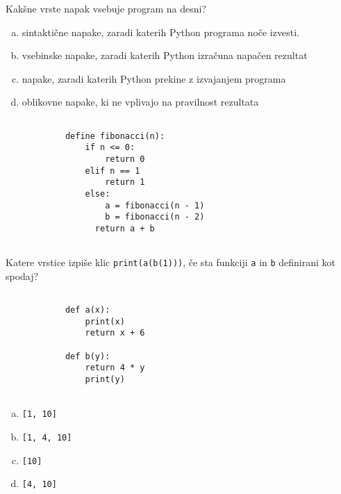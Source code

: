 \documentclass[arhiv, 10pt]{../izpit}
\newcommand{\inlinepy}[1]{\texttt{#1}}
\begin{document}
        \naloga*
        \begin{multicols}{2}
        \noindent
        Kakšne vrste napak vsebuje program na desni?

        \begin{enumerate}[(a)]
\item sintaktične napake, zaradi katerih Python programa noče izvesti.
\item vsebinske napake, zaradi katerih Python izračuna napačen rezultat
\item napake, zaradi katerih Python prekine z izvajanjem programa
\item oblikovne napake, ki ne vplivajo na pravilnost rezultata
\end{enumerate}

        \columnbreak

        \begin{verbatim}
        
            define fibonacci(n):
                if n <= 0:
                    return 0
                elif n == 1
                    return 1
                else:
                    a = fibonacci(n - 1)
                    b = fibonacci(n - 2)
                  return a + b
            
        \end{verbatim}

        \end{multicols}

    
        \naloga*
        Katere vrstice izpiše klic \inlinepy{print(a(b(1)))}, če sta funkciji \inlinepy{a} in \inlinepy{b} definirani kot spodaj?

        \begin{multicols}{2}
        \begin{verbatim}
        
            def a(x):
                print(x)
                return x + 6

            def b(y):
                return 4 * y
                print(y)
        
        \end{verbatim}

        \begin{enumerate}[(a)]
\item \inlinepy{[1, 10]}
\item \inlinepy{[1, 4, 10]}
\item \inlinepy{[10]}
\item \inlinepy{[4, 10]}
\end{enumerate}

        \end{multicols}
    
\end{document}
